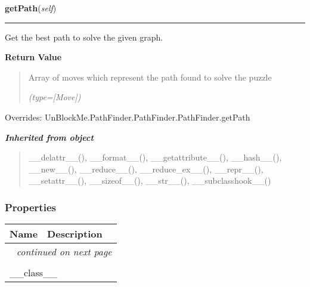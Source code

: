 \hspace{.8\funcindent}\begin{boxedminipage}{\funcwidth}

    \raggedright \textbf{getPath}(\textit{self})

    \vspace{-1.5ex}

    \rule{\textwidth}{0.5\fboxrule}
\setlength{\parskip}{2ex}
    Get the best path to solve the given graph.

\setlength{\parskip}{1ex}
      \textbf{Return Value}
    \vspace{-1ex}

      \begin{quote}
      Array of moves which represent the path found to solve the puzzle

      {\it (type=[Move])}

      \end{quote}

      Overrides: UnBlockMe.PathFinder.PathFinder.PathFinder.getPath

    \end{boxedminipage}


\large{\textbf{\textit{Inherited from object}}}

\begin{quote}
\_\_delattr\_\_(), \_\_format\_\_(), \_\_getattribute\_\_(), \_\_hash\_\_(), \_\_new\_\_(), \_\_reduce\_\_(), \_\_reduce\_ex\_\_(), \_\_repr\_\_(), \_\_setattr\_\_(), \_\_sizeof\_\_(), \_\_str\_\_(), \_\_subclasshook\_\_()
\end{quote}


  \subsubsection{Properties}

    \vspace{-1cm}
\hspace{\varindent}\begin{longtable}{|p{\varnamewidth}|p{\vardescrwidth}|l}
\cline{1-2}
\cline{1-2} \centering \textbf{Name} & \centering \textbf{Description}& \\
\cline{1-2}
\endhead\cline{1-2}\multicolumn{3}{r}{\small\textit{continued on next page}}\\\endfoot\cline{1-2}
\endlastfoot\multicolumn{2}{|l|}{\textit{Inherited from object}}\\
\multicolumn{2}{|p{\varwidth}|}{\raggedright \_\_class\_\_}\\
\cline{1-2}
\end{longtable}

